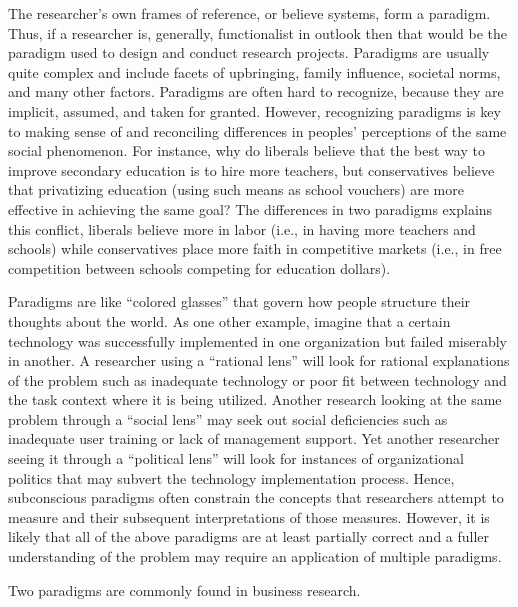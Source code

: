 \documentclass[]{book}
\theoremstyle{definition}
\theoremstyle{definition}
\theoremstyle{definition}
\theoremstyle{remark}
\begin{document}
The researcher's own frames of reference, or believe systems, form a
paradigm. Thus, if a researcher is, generally, functionalist in outlook
then that would be the paradigm used to design and conduct research
projects. Paradigms are usually quite complex and include facets of
upbringing, family influence, societal norms, and many other factors.
Paradigms are often hard to recognize, because they are implicit,
assumed, and taken for granted. However, recognizing paradigms is key to
making sense of and reconciling differences in peoples' perceptions of
the same social phenomenon. For instance, why do liberals believe that
the best way to improve secondary education is to hire more teachers,
but conservatives believe that privatizing education (using such means
as school vouchers) are more effective in achieving the same goal? The
differences in two paradigms explains this conflict, liberals believe
more in labor (i.e., in having more teachers and schools) while
conservatives place more faith in competitive markets (i.e., in free
competition between schools competing for education dollars).

Paradigms are like ``colored glasses'' that govern how people structure
their thoughts about the world. As one other example, imagine that a
certain technology was successfully implemented in one organization but
failed miserably in another. A researcher using a ``rational lens'' will
look for rational explanations of the problem such as inadequate
technology or poor fit between technology and the task context where it
is being utilized. Another research looking at the same problem through
a ``social lens'' may seek out social deficiencies such as inadequate
user training or lack of management support. Yet another researcher
seeing it through a ``political lens'' will look for instances of
organizational politics that may subvert the technology implementation
process. Hence, subconscious paradigms often constrain the concepts that
researchers attempt to measure and their subsequent interpretations of
those measures. However, it is likely that all of the above paradigms
are at least partially correct and a fuller understanding of the problem
may require an application of multiple paradigms.

Two paradigms are commonly found in business research.
\end{document}
